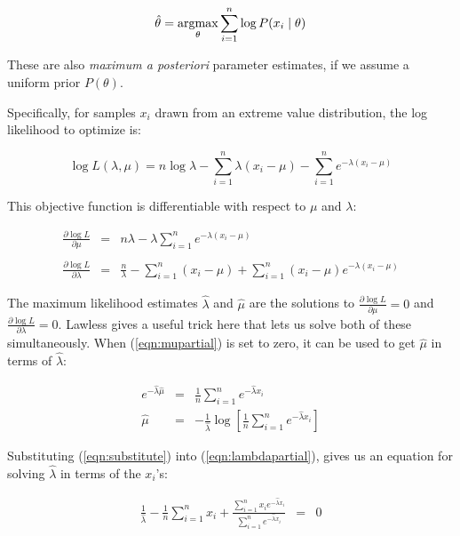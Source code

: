 \[
   \hat{\theta} = \mathop{\mathrm{argmax}}\limits_{\theta} \sum_{i=1}^{n} \log P(x_i \mid \theta)
\]

These are also \emph{maximum a posteriori} parameter estimates, if we
assume a uniform prior $P(\theta)$.

Specifically, for samples $x_i$ drawn from an extreme value
distribution, the log likelihood to optimize is:

\begin{equation}
\log L(\lambda, \mu) = n \log \lambda - \sum_{i=1}^{n} \lambda(x_i -
\mu) - \sum_{i=1}^{n} e^{-\lambda(x_i - \mu)}
\label{eqn:gumbel_logL}
\end{equation}

This objective function is differentiable with respect to $\mu$ and
$\lambda$:

\begin{eqnarray}
\frac{\partial \log L}{\partial \mu} & = &
n \lambda - \lambda \sum_{i=1}^{n} e^{-\lambda (x_i - \mu)}\\%
\\%
\label{eqn:mupartial}
\frac{\partial \log L}{\partial \lambda} & = &
\frac{n}{\lambda} - \sum_{i=1}^{n} (x_i - \mu) +  
\sum_{i=1}^{n} (x_i - \mu) e^{-\lambda (x_i - \mu)}
\label{eqn:lambdapartial}
\end{eqnarray}

The maximum likelihood estimates $\hat{\lambda}$ and $\hat{\mu}$ are
the solutions to $\frac{\partial \log L}{\partial \mu} = 0$ and
$\frac{\partial \log L}{\partial \lambda} = 0$. Lawless
\citep{Lawless82} gives a useful trick here that lets us solve both of
these simultaneously. When (\ref{eqn:mupartial}) is set to zero, it
can be used to get $\hat{\mu}$ in terms of $\hat{\lambda}$:

\begin{eqnarray}
e^{-\hat{\lambda} \hat{\mu}} & = & \frac{1}{n} \sum_{i=1}^{n} e^{-\hat{\lambda} x_i} 
\label{eqn:substitute}\\
\hat{\mu} & = & - \frac{1}{\hat{\lambda}} 
	\log \left[ \frac{1}{n} \sum_{i=1}^{n} e^{-\hat{\lambda} x_i} \right]
\label{eqn:solvemu}
\end{eqnarray}

Substituting (\ref{eqn:substitute}) into (\ref{eqn:lambdapartial}),
gives us an equation for solving $\hat{\lambda}$ in terms of the
$x_i$'s:

\begin{eqnarray}
\frac{1}{\hat{\lambda}} - \frac{1}{n} \sum_{i=1}^{n} x_i +
\frac{\sum_{i=1}^{n} x_i e^{-\hat{\lambda} x_i}}
     {\sum_{i=1}^{n} e^{-\hat{\lambda} x_i}} 
& = & 0
\label{eqn:newtontarget}
\end{eqnarray}

